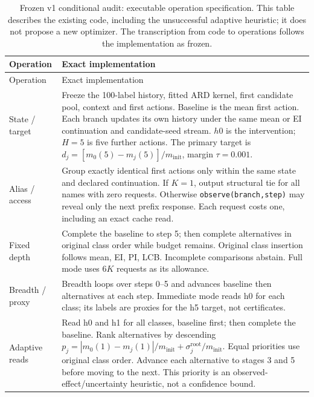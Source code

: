\FloatBarrier\begingroup\fontsize{8.5}{10.5}\selectfont\setlength\tabcolsep{3pt}
\begin{longtable}{@{}>{\raggedright\arraybackslash}p{.17\linewidth}>{\raggedright\arraybackslash}p{}@{}}
\caption{Frozen v1 conditional audit: executable operation specification. This table describes the existing code, including the unsuccessful adaptive heuristic; it does not propose a new optimizer. The transcription from code to operations follows the implementation as frozen.}\label{tab:conditional_algorithm}\tabularnewline
\toprule
Operation & Exact implementation \\
\midrule
\endfirsthead
\toprule
Operation & Exact implementation \\
\midrule
\endhead
\bottomrule
\endlastfoot
State / target & Freeze the 100-label history, fitted ARD kernel, first candidate pool, context and first actions. Baseline is the mean first action. Each branch updates its own history under the same mean or EI continuation and candidate-seed stream. $h0$ is the intervention; $H=5$ is five further actions. The primary target is $d_j=[m_0(5)-m_j(5)]/m_{\mathrm{init}}$, margin $\tau=0.001$. \\
Alias / access & Group exactly identical first actions only within the same state and declared continuation. If $K=1$, output structural tie for all names with zero requests. Otherwise \texttt{observe(branch,step)} may reveal only the next prefix response. Each request costs one, including an exact cache read. \\
Fixed depth & Complete the baseline to step 5; then complete alternatives in original class order while budget remains. Original class insertion follows mean, EI, PI, LCB. Incomplete comparisons abstain. Full mode uses $6K$ requests as its allowance. \\
Breadth / proxy & Breadth loops over steps 0--5 and advances baseline then alternatives at each step. Immediate mode reads h0 for each class; its labels are proxies for the h5 target, not certificates. \\
Adaptive reads & Read h0 and h1 for all classes, baseline first; then complete the baseline. Rank alternatives by descending $p_j=|m_0(1)-m_j(1)|/m_{\mathrm{init}}+\sigma_j^{\mathrm{root}}/m_{\mathrm{init}}$. Equal priorities use original class order. Advance each alternative to stages 3 and 5 before moving to the next. This priority is an observed-effect/uncertainty heuristic, not a confidence bound. \\

\end{longtable}
